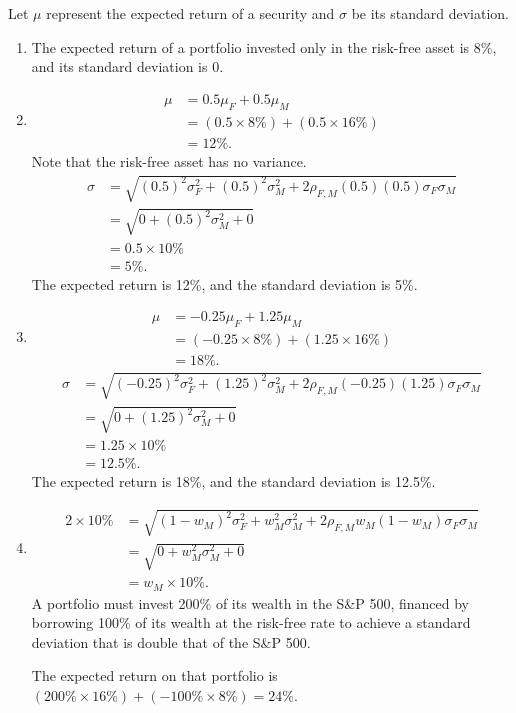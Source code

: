 \documentclass[12pt]{article}
\begin{document}
\section{}
Let $\mu$ represent the expected return of a security and $\sigma$ be its standard deviation.
\begin{enumerate}
    \item The expected return of a portfolio invested only in the risk-free asset is $8\%$, and its standard deviation is 0. 
    \item\begin{align*}
    \mu
    &=0.5\mu_F+0.5\mu_M\\
    &=(0.5\times 8\%)+(0.5\times 16\%)\\
    &=12\%.
    \end{align*}
    Note that the risk-free asset has no variance.
    \begin{align*}
    \sigma
    &=\sqrt{(0.5)^2\sigma_F^2+(0.5)^2\sigma_M^2+2\rho_{F,M}(0.5)(0.5)\sigma_F\sigma_M}\\
    &=\sqrt{0+(0.5)^2\sigma_M^2+0}\\
    &=0.5\times 10\%\\
    &=5\%.
    \end{align*}
    The expected return is 12\%, and the standard deviation is 5\%.
    \item\begin{align*}
    \mu
    &=-0.25\mu_F+1.25\mu_M\\
    &=(-0.25\times 8\%)+(1.25\times 16\%)\\
    &=18\%.
    \end{align*}
    \begin{align*}
    \sigma
    &=\sqrt{(-0.25)^2\sigma_F^2+(1.25)^2\sigma_M^2+2\rho_{F,M}(-0.25)(1.25)\sigma_F\sigma_M}\\
    &=\sqrt{0+(1.25)^2\sigma_M^2+0}\\
    &=1.25\times 10\%\\
    &=12.5\%.
    \end{align*}
    The expected return is 18\%, and the standard deviation is 12.5\%.
    \item 
    \begin{align*}
    2\times 10\%
    &=\sqrt{(1-w_M)^2\sigma_F^2+w_M^2\sigma_M^2+2\rho_{F,M}w_M(1-w_M)\sigma_F\sigma_M}\\
    &=\sqrt{0+w_M^2\sigma_M^2+0}\\
    &=w_M\times 10\%.
    \end{align*}
    A portfolio must invest 200\% of its wealth in the S\&P 500, financed by borrowing 100\% of its wealth at the risk-free rate to achieve a standard deviation that is double that of the S\&P 500. 

    The expected return on that portfolio is $(200\%\times 16\%)+(-100\%\times 8\%)=24\%$.
\end{enumerate}
\end{document}
